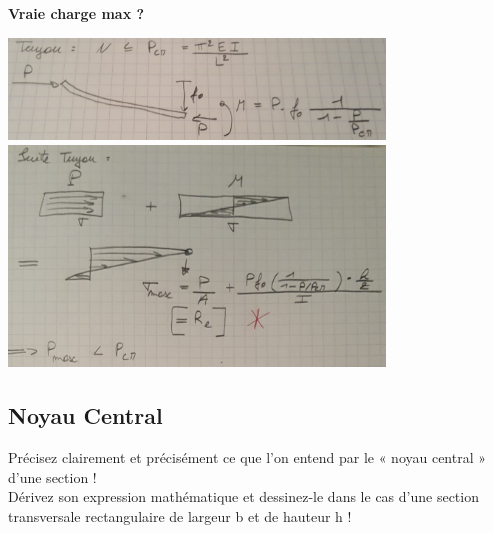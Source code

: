 \documentclass[a4paper]{article}
\begin{document}
\textbf{Vraie charge max ?}
\begin{center}
\includegraphics[width=0.75\textwidth]{images/tuyau01.PNG}
\includegraphics[width=0.75\textwidth]{images/tuyau02.PNG}
\end{center}





\subsection{Noyau Central}





\begin{siderules}
Précisez clairement et précisément ce que l’on entend par le « noyau central » d’une section ! \\
Dérivez son expression mathématique et dessinez-le dans le cas d’une section transversale rectangulaire de largeur b et de hauteur h !
\end{siderules}
\end{document}
